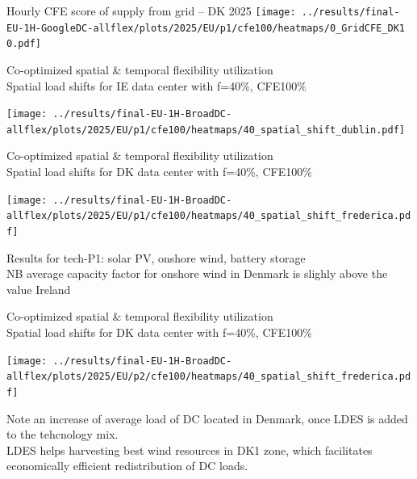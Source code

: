 \begin{frame}{Hourly CFE score of supply from grid -- DK 2025}
  \vspace{.5cm}
  \texttt{[image: ../results/final-EU-1H-GoogleDC-allflex/plots/2025/EU/p1/cfe100/heatmaps/0\_GridCFE\_DK1 0.pdf]}
\end{frame}




\begin{frame}{Co-optimized spatial \& temporal flexibility utilization \\
  Spatial load shifts for IE data center with f=40\%, CFE100\%}

  \vspace{.3cm}
  
  \centering
  \texttt{[image: ../results/final-EU-1H-BroadDC-allflex/plots/2025/EU/p1/cfe100/heatmaps/40\_spatial\_shift\_dublin.pdf]}

  \vspace{.3cm}

\end{frame}


\begin{frame}{Co-optimized spatial \& temporal flexibility utilization \\
  Spatial load shifts for DK data center with f=40\%, CFE100\%}

  \vspace{.3cm}
  
  \centering
  \texttt{[image: ../results/final-EU-1H-BroadDC-allflex/plots/2025/EU/p1/cfe100/heatmaps/40\_spatial\_shift\_frederica.pdf]}

  {\scriptsize
  Results for tech-P1: solar PV, onshore wind, battery storage \\
  NB average capacity factor for onshore wind in Denmark is slighly above the value Ireland
  }

\end{frame}


\begin{frame}{Co-optimized spatial \& temporal flexibility utilization \\
  Spatial load shifts for DK data center with f=40\%, CFE100\%}

  \vspace{.3cm}
  
  \centering
  \texttt{[image: ../results/final-EU-1H-BroadDC-allflex/plots/2025/EU/p2/cfe100/heatmaps/40\_spatial\_shift\_frederica.pdf]}

  {\scriptsize
  Note an increase of average load of DC located in Denmark, once LDES is added to the tehcnology mix. \\
  LDES helps harvesting best wind resources in DK1 zone, 
  which facilitates \alert{economically efficient redistribution} of DC loads.
  }
\end{frame}


